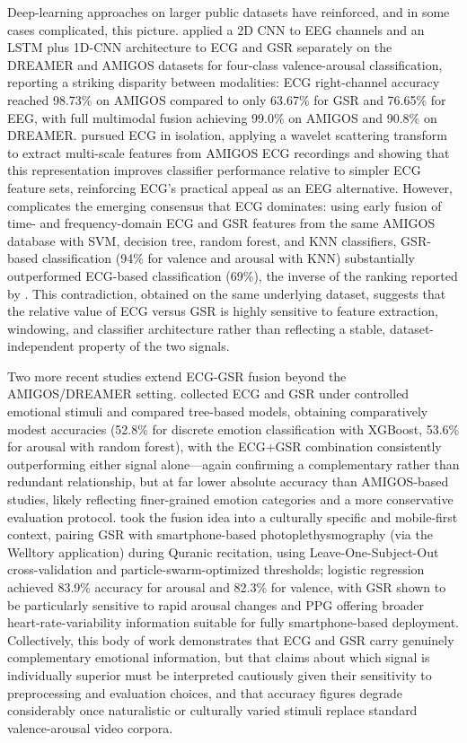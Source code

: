 Deep-learning approaches on larger public datasets have reinforced, and in some cases complicated, this picture. \cite{dar2020cnn} applied a 2D CNN to EEG channels and an LSTM plus 1D-CNN architecture to ECG and GSR separately on the DREAMER and AMIGOS datasets for four-class valence-arousal classification, reporting a striking disparity between modalities: ECG right-channel accuracy reached 98.73\% on AMIGOS compared to only 63.67\% for GSR and 76.65\% for EEG, with full multimodal fusion achieving 99.0\% on AMIGOS and 90.8\% on DREAMER. \cite{sepulveda2021emotion} pursued ECG in isolation, applying a wavelet scattering transform to extract multi-scale features from AMIGOS ECG recordings and showing that this representation improves classifier performance relative to simpler ECG feature sets, reinforcing ECG's practical appeal as an EEG alternative. However, \cite{dessai2024multimodal} complicates the emerging consensus that ECG dominates: using early fusion of time- and frequency-domain ECG and GSR features from the same AMIGOS database with SVM, decision tree, random forest, and KNN classifiers, GSR-based classification (94\% for valence and arousal with KNN) substantially outperformed ECG-based classification (69\%), the inverse of the ranking reported by \cite{dar2020cnn}. This contradiction, obtained on the same underlying dataset, suggests that the relative value of ECG versus GSR is highly sensitive to feature extraction, windowing, and classifier architecture rather than reflecting a stable, dataset-independent property of the two signals.

Two more recent studies extend ECG-GSR fusion beyond the AMIGOS/DREAMER setting. \cite{site2026emotion} collected ECG and GSR under controlled emotional stimuli and compared tree-based models, obtaining comparatively modest accuracies (52.8\% for discrete emotion classification with XGBoost, 53.6\% for arousal with random forest), with the ECG+GSR combination consistently outperforming either signal alone---again confirming a complementary rather than redundant relationship, but at far lower absolute accuracy than AMIGOS-based studies, likely reflecting finer-grained emotion categories and a more conservative evaluation protocol. \cite{darabkh2026exploring} took the fusion idea into a culturally specific and mobile-first context, pairing GSR with smartphone-based photoplethysmography (via the Welltory application) during Quranic recitation, using Leave-One-Subject-Out cross-validation and particle-swarm-optimized thresholds; logistic regression achieved 83.9\% accuracy for arousal and 82.3\% for valence, with GSR shown to be particularly sensitive to rapid arousal changes and PPG offering broader heart-rate-variability information suitable for fully smartphone-based deployment. Collectively, this body of work demonstrates that ECG and GSR carry genuinely complementary emotional information, but that claims about which signal is individually superior must be interpreted cautiously given their sensitivity to preprocessing and evaluation choices, and that accuracy figures degrade considerably once naturalistic or culturally varied stimuli replace standard valence-arousal video corpora.

